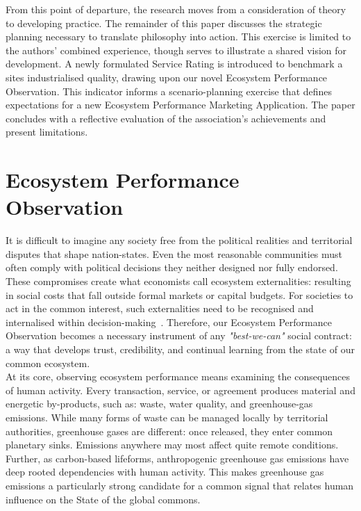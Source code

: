 \documentclass[12pt, oneside]{article}   	%
\begin{document}
From this point of departure, the research moves from a consideration of theory to developing practice.
The remainder of this paper discusses the strategic planning necessary to translate philosophy into action.
This exercise is limited to the authors’ combined experience, though serves to illustrate a shared vision for development.
A newly formulated Service Rating is introduced to benchmark a sites industrialised quality, drawing upon our novel Ecosystem Performance Observation.
This indicator informs a scenario-planning exercise that defines expectations for a new Ecosystem Performance Marketing Application.
The paper concludes with a reflective evaluation of the association's achievements and present limitations.\\

\section{Ecosystem Performance Observation}

It is difficult to imagine any society free from the political realities and territorial disputes that shape nation-states.
Even the most reasonable communities must often comply with political decisions they neither designed nor fully endorsed.
These compromises create what economists call ecosystem externalities: resulting in social costs that fall outside formal markets or capital budgets.
For societies to act in the common interest, such externalities need to be recognised and internalised within decision-making~\cite{rc1}.
Therefore, our Ecosystem Performance Observation becomes a necessary instrument of any \emph{"best-we-can"} social contract: a way that develops trust, credibility, and continual learning from the state of our common ecosystem.\\

At its core, observing ecosystem performance means examining the consequences of human activity.
Every transaction, service, or agreement produces material and energetic by-products, such as: waste, water quality, and greenhouse-gas emissions.
While many forms of waste can be managed locally by territorial authorities, greenhouse gases are different: once released, they enter common planetary sinks.
Emissions anywhere may most affect quite remote conditions.
Further, as carbon-based lifeforms, anthropogenic greenhouse gas emissions have deep rooted dependencies with human activity.
This makes greenhouse gas emissions a particularly strong candidate for a common signal that relates human influence on the State of the global commons.\\
\end{document}
